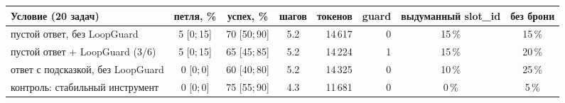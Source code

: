 \begin{tabular}{lcccrrcc}\toprule
Условие (20 задач) & петля, \% & успех, \% & шагов & токенов & guard & выдуманный slot\_id & без брони \\ \midrule
пустой ответ, без LoopGuard & 5 [0;\,15] & 70 [50;\,90] & 5.2 & 14\,617 & 0 & 15\,\% & 15\,\% \\
пустой ответ + LoopGuard (3/6) & 5 [0;\,15] & 65 [45;\,85] & 5.2 & 14\,224 & 1 & 15\,\% & 20\,\% \\
ответ с подсказкой, без LoopGuard & 0 [0;\,0] & 60 [40;\,80] & 5.2 & 14\,325 & 0 & 10\,\% & 25\,\% \\
контроль: стабильный инструмент & 0 [0;\,0] & 75 [55;\,90] & 4.3 & 11\,681 & 0 & 0\,\% & 5\,\% \\
\bottomrule\end{tabular}